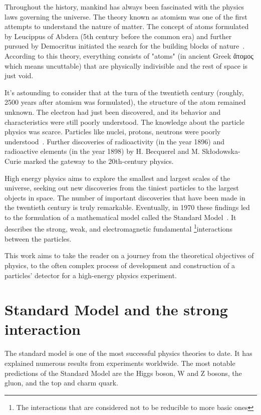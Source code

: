 Throughout the history, mankind has always been fascinated with the physics laws governing the universe. The theory known as atomism was one of the first attempts to understand the nature of matter. The concept of atoms formulated by Leucippus of Abdera (5th century before the common era) and further pursued by Democritus initiated the search for the building blocks of nature~\cite{sep-atomism-ancient}. According to this theory, everything consists of "atoms" (in ancient Greek \foreignlanguage{greek}{ἄτομος} which means uncuttable) that are physically indivisible and the rest of space is just void. 

It's astounding to consider that at the turn of the twentieth century (roughly, 2500 years after atomism was formulated), the structure of the atom remained unknown. The electron had just been discovered, and its behavior and characteristics were still poorly understood. The knowledge about the particle physics was scarce. Particles like nuclei, protons, neutrons were poorly understood~\cite{intro_particle_physics}. 
Further discoveries of radioactivity (in the year 1896) and radioactive elements (in the year 1898) by H. Becquerel and M. Skłodowska-Curie marked the gateway to the 20th-century physics. 

High energy physics aims to explore the smallest and largest scales of the universe, seeking out new discoveries from the tiniest particles to the largest objects in space.
The number of important discoveries that have been made in the twentieth century is truly remarkable. Eventually, in 1970 these findings led to the formulation of a mathematical model called the Standard Model~\cite{intro_particle_physics}.  It describes the strong, weak, and electromagnetic fundamental \footnote{The interactions that are considered not to be reducible to more basic ones}{interactions} between the particles. 
 
 
 This work aims to take the reader on a journey from the theoretical objectives of physics, to the often complex process of development and construction of a particles' detector for a high-energy physics experiment.
 
\section{Standard Model and the strong interaction}

The standard model is one of the most successful physics theories to date. It has explained numerous results from experiments worldwide. The most notable predictions of the Standard Model are the Higgs boson, W and Z bosons, the gluon, and the top and charm quark.

